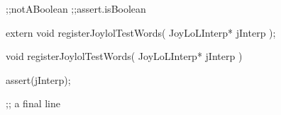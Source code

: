 \startJoylolTest
  ;;notABoolean
  ;;assert.isBoolean
\stopJoylolTest
\stopTestCase
\stopTestSuite

\startTestSuite[assertTrue]

\stopTestSuite

\startTestSuite[assertFalse]

\stopTestSuite

\startTestSuite[assertNil]

\stopTestSuite

\startTestSuite[assertNotNil]

\stopTestSuite

\startTestSuite[assertAtom]

\stopTestSuite

\startTestSuite[assertPair]

\stopTestSuite

\startTestSuite[assertNatural]

\stopTestSuite

\startTestSuite[assertSymbol]

\stopTestSuite

\startTestSuite[assertContext]

\stopTestSuite

\startTestSuite[assertDictionary]

\stopTestSuite

\startTestSuite[assertDictNode]

\stopTestSuite


\startCHeader
extern void registerJoylolTestWords(
  JoyLoLInterp* jInterp
);
\stopCHeader
{}

\startCCode
void registerJoylolTestWords(
  JoyLoLInterp* jInterp
) {
  assert(jInterp);

}
\stopCCode

\startJoylolCode
;; a final line
\stopJoylolCode